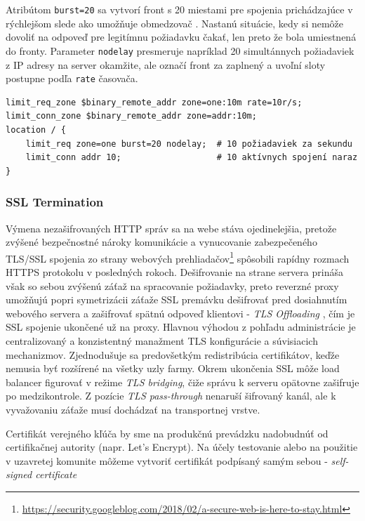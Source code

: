 \documentclass[12pt, a4paper]{article}
\begin{document}
Atribútom \verb|burst=20| sa vytvorí front s 20 miestami pre spojenia prichádzajúce v rýchlejšom slede ako 
umožňuje obmedzovač \cite{nginx-rate-limiting}. Nastanú situácie, kedy si nemôže dovoliť na odpoveď pre 
legitímnu požiadavku čakať, len preto že bola umiestnená do fronty. Parameter \verb|nodelay| presmeruje 
napríklad 20 simultánnych požiadaviek z IP adresy na server okamžite, ale označí front za zaplnený a uvoľní 
sloty postupne podľa \verb|rate| časovača.

\begin{lstlisting}
limit_req_zone $binary_remote_addr zone=one:10m rate=10r/s;
limit_conn_zone $binary_remote_addr zone=addr:10m;
location / { 
    limit_req zone=one burst=20 nodelay;  # 10 požiadaviek za sekundu
    limit_conn addr 10;                   # 10 aktívnych spojení naraz
}
\end{lstlisting}

\subsubsection{SSL Termination}
Výmena nezašifrovaných HTTP správ sa na webe stáva ojedinelejšia, pretože zvýšené bezpečnostné
nároky komunikácie a vynucovanie zabezpečeného TLS/SSL spojenia zo strany webových 
prehliadačov\footnote{\url{https://security.googleblog.com/2018/02/a-secure-web-is-here-to-stay.html}} 
spôsobili rapídny rozmach HTTPS protokolu v posledných rokoch. Dešifrovanie na strane servera prináša však 
so sebou zvýšenú záťaž na spracovanie požiadavky, preto reverzné proxy umožňujú popri symetrizácii záťaže
SSL premávku dešifrovať pred dosiahnutím webového servera a zašifrovať spätnú odpoveď klientovi - 
\emph{TLS Offloading} \cite{ssl-termination}, čím je SSL spojenie ukončené už na proxy. Hlavnou výhodou z 
pohľadu administrácie je centralizovaný a konzistentný manažment TLS konfigurácie a súvisiacich mechanizmov. 
Zjednodušuje sa predovšetkým redistribúcia certifikátov, keďže nemusia byť rozšírené na všetky uzly farmy. 
Okrem ukončenia SSL môže load balancer figurovať v režime \emph{TLS bridging}, čiže správu k serveru 
opätovne zašifruje po medzikontrole. Z pozície \emph{TLS pass-through} nenaruší šifrovaný kanál, ale k 
vyvažovaniu záťaže musí dochádzať na transportnej vrstve.

Certifikát verejného kľúča by sme na produkčnú prevádzku nadobudnúť od certifikačnej autority 
(napr. Let's Encrypt). Na účely testovanie alebo na použitie v uzavretej komunite môžeme vytvoriť
certifikát podpísaný samým sebou - \emph{self-signed certificate} 
\end{document}
